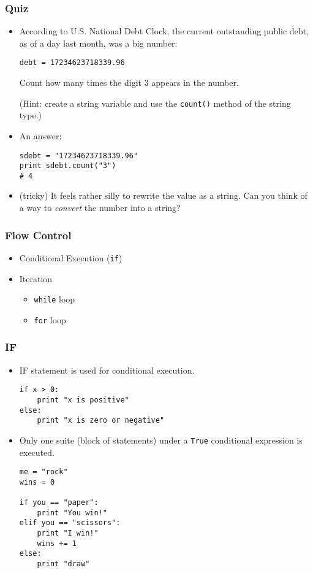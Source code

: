 \documentclass{beamer}
\begin{document}
\begin{frame}[fragile]
\frametitle{Quiz}
\begin{itemize}
\item According to U.S. National Debt Clock,
      the current outstanding public debt, as of 
      a day last month, was a big number:
\begin{lstlisting}
debt = 17234623718339.96
\end{lstlisting}
      Count how many times the digit 3 appears
      in the number.

      (Hint: create a string variable and use
       the \lstinline{count()} method of
       the string type.)  
\item<2-> An answer:
\begin{lstlisting}
sdebt = "17234623718339.96"
print sdebt.count("3")
# 4
\end{lstlisting}
\item<3-> (tricky) It feels rather silly to rewrite the
          value as a string.
          Can you think of a way to \emph{convert}
          the number into a string? 
\end{itemize}
\end{frame}

\begin{frame}[fragile]
\frametitle{Flow Control}
\begin{itemize}
\item Conditional Execution (\lstinline{if})
\item Iteration
\begin{itemize}
\item \lstinline{while} loop
\item \lstinline{for} loop
\end{itemize}
\end{itemize}
\end{frame}

\begin{frame}[fragile]
\frametitle{IF}
\begin{itemize}
\item IF statement is used for conditional execution.
\begin{lstlisting}
if x > 0:
    print "x is positive"
else:
    print "x is zero or negative" 
\end{lstlisting}
\item Only one suite (block of statements) under a
      \lstinline{True} conditional expression is executed.
\begin{lstlisting}
me = "rock"
wins = 0

if you == "paper":
    print "You win!"
elif you == "scissors":
    print "I win!"
    wins += 1
else:
    print "draw"      
\end{lstlisting}
\end{itemize}
\end{frame}
\end{document}
